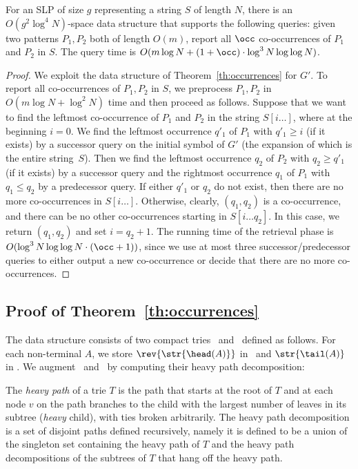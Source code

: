 \begin{corollary}\label{cor:all}
For an SLP of size $g$ representing a string $S$ of length $N$, there is an $O(g^2\log^4 N)$-space data structure that supports the following queries: given two patterns $P_1, P_2$ both of length $O(m)$, report all $\occ$ co-occurrences of $P_1$ and $P_2$ in $S$. The query time is $O(m\log N + (1+\occ) \cdot \log^3 N \log \log N)$. 
\end{corollary}
\begin{proof}
We exploit the data structure of Theorem~\ref{th:occurrences} for $G'$. To report all co-occurrences of $P_1,P_2$ in $S$, we preprocess $P_1,P_2$ in $O(m  \log N + \log^2 N)$ time and then proceed as follows. Suppose that we want to find the leftmost co-occurrence of $P_1$ and $P_2$ in the string $S[i\dots]$, where at the beginning $i=0$. We find the leftmost occurrence $q'_1$ of $P_1$ with $q'_1\geq i$ (if it exists) by a successor query on the initial symbol of $G'$ (the expansion of which is the entire string~$S$). Then we find the leftmost occurrence $q_2$ of $P_2$ with $q_2\geq q'_1$ (if it exists) by a successor query and the rightmost occurrence $q_1$ of $P_1$ with $q_1\leq q_2$ by a predecessor query. If either $q'_1$ or $q_2$ do not exist, then there are no more co-occurrences in $S[i\dots]$. Otherwise, clearly, $(q_1,q_2)$ is a co-occurrence, and there can be no other co-occurrences starting in $S[i\dots q_2]$. In this case, we return $(q_1,q_2)$ and set $i=q_2+1$. The running time of the retrieval phase is $O(\log^{3}N\log\log N\cdot (\occ+1))$, since we use at most three successor/predecessor queries to either output a new co-occurrence or decide that there are no more co-occurrences.
\end{proof}

\subsection{Proof of Theorem~\ref{th:occurrences}}
The data structure consists of two compact tries \Tpre\ and \Tsuf\ defined as follows. For each non-terminal $A$, we store $\rev{\str{\head(A)}}$ in \Tpre\ and $\str{\tail(A)}$ in  \Tsuf. We augment \Tpre\ and \Tsuf\ by computing their heavy path decomposition: 

\begin{definition}
The \emph{heavy path} of a trie $T$ is the path that starts at the root of $T$ and at each node $v$ on the path branches to the child with the largest number of leaves in its subtree (\emph{heavy} child), with ties broken arbitrarily. The heavy path decomposition is a set of disjoint paths defined recursively, namely it is defined to be a union of the singleton set containing the heavy path of $T$ and the heavy path decompositions of the subtrees of $T$ that hang off the heavy path. 
\end{definition}

